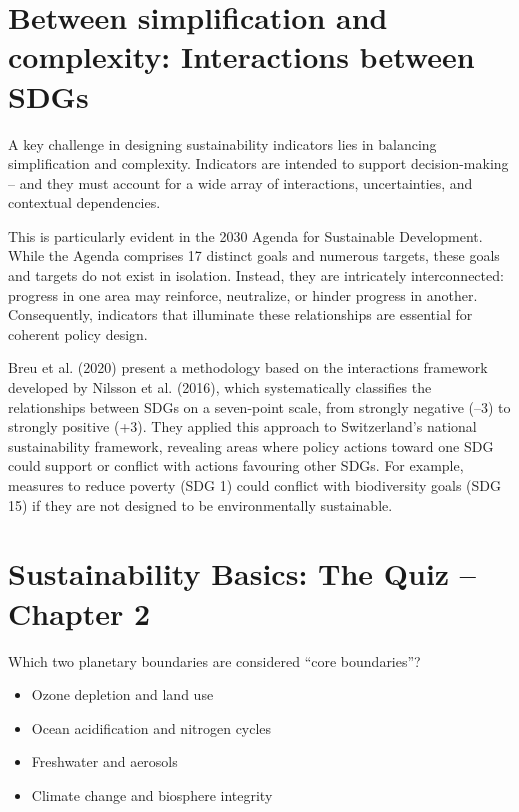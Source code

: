 \documentclass[
  a4paper,
  DIV=11,
  numbers=noendperiod,
  oneside,
  openany]{scrreprt}
\providecommand{\tightlist}{%
  \setlength{\itemsep}{0pt}\setlength{\parskip}{0pt}}
\begin{document}
\section{Between simplification and complexity: Interactions between
SDGs}\label{between-simplification-and-complexity-interactions-between-sdgs}

A key challenge in designing sustainability indicators lies in balancing
simplification and complexity. Indicators are intended to support
decision-making -- and they must account for a wide array of
interactions, uncertainties, and contextual dependencies.

This is particularly evident in the 2030 Agenda for Sustainable
Development. While the Agenda comprises 17 distinct goals and numerous
targets, these goals and targets do not exist in isolation. Instead,
they are intricately interconnected: progress in one area may reinforce,
neutralize, or hinder progress in another. Consequently, indicators that
illuminate these relationships are essential for coherent policy design.

Breu et al. (2020) present a methodology based on the interactions
framework developed by Nilsson et al. (2016), which systematically
classifies the relationships between SDGs on a seven-point scale, from
strongly negative (--3) to strongly positive (+3). They applied this
approach to Switzerland's national sustainability framework, revealing
areas where policy actions toward one SDG could support or conflict with
actions favouring other SDGs. For example, measures to reduce poverty
(SDG 1) could conflict with biodiversity goals (SDG 15) if they are not
designed to be environmentally sustainable.

\section{Sustainability Basics: The Quiz -- Chapter
2}\label{sustainability-basics-the-quiz-chapter-2}

Which two planetary boundaries are considered ``core boundaries''?

\begin{itemize}
\tightlist
\item[$\square$]
  Ozone depletion and land use
\item[$\square$]
  Ocean acidification and nitrogen cycles
\item[$\square$]
  Freshwater and aerosols
\item[$\square$]
  Climate change and biosphere integrity
\end{itemize}
\end{document}
